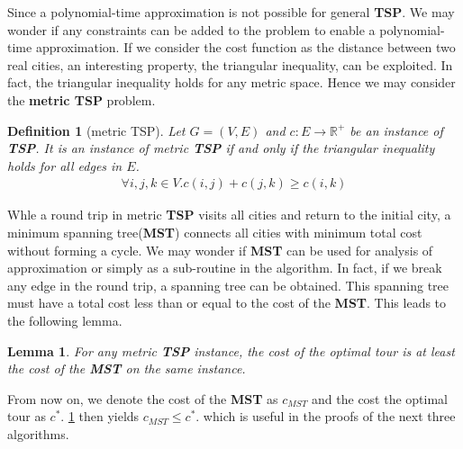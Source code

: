 \documentclass[11pt,psfig,times]{article}
\newtheorem{lemma}[theorem]{Lemma}
\newtheorem{definition}[theorem]{Definition}
\begin{document}
Since a polynomial-time approximation is not possible for general \textbf{TSP}. We may wonder if any constraints 
can be added to the problem to enable a polynomial-time approximation. If we consider the cost function as the distance between 
two real cities, an interesting property, the triangular inequality, can be exploited. 
In fact, the triangular inequality holds for any metric space. Hence we may consider the \textbf{metric TSP} problem.
\begin{definition}[metric TSP]
    Let $G = (V, E)$ and $c: E \rightarrow \mathbb{R}^+$ be an instance of \textbf{TSP}. It is an instance of metric \textbf{TSP} 
    if and only if the triangular inequality holds for all edges in $E$.
    \begin{align*}
        \forall i, j, k \in V. c(i, j) + c(j, k) \geq c(i, k)
    \end{align*}
\end{definition} 
Whle a round trip in metric \textbf{TSP} visits all cities and return to the initial city, a minimum spanning tree(\textbf{MST})
connects all cities with minimum total cost without forming a cycle. We may wonder if \textbf{MST} can be used for analysis of 
approximation or simply as a sub-routine in the algorithm. In fact, if we break any edge in the round trip, a spanning tree 
can be obtained. This spanning tree must have a total cost less than or equal to the cost of the \textbf{MST}. This 
leads to the following lemma. 
\begin{lemma}
    \label{lemma:MST}
    For any metric \textbf{TSP} instance, the cost of the optimal tour is at least the cost of the \textbf{MST} on the same 
    instance.
\end{lemma}
From now on, we denote the cost of the \textbf{MST} as $c_{MST}$ and the cost the optimal tour as $c^*$. \cref{lemma:MST} then 
yields $c_{MST} \leq c^*$. which is useful in the proofs of the next three algorithms. 
\end{document}
